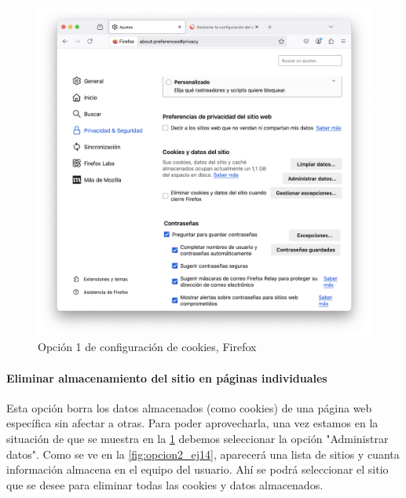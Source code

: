 \begin{figure}[H]   
    \includegraphics[width=\textwidth]{opcion1_ej14.png}
    \caption{Opción 1 de configuración de cookies, Firefox}
    \label{fig:opcion1_ej14}
\end{figure}


\paragraph{Eliminar almacenamiento del sitio en páginas individuales }

Esta opción borra los datos almacenados (como cookies) de una página web específica sin afectar a otras. Para poder aprovecharla, una vez estamos en la situación de que se muestra en la \ref{fig:opcion1_ej14} debemos seleccionar la opción "Administrar datos". Como se ve en la \ref{fig:opcion2_ej14}, aparecerá una lista de sitios y cuanta información almacena en el equipo del usuario. Ahí se podrá seleccionar el sitio que se desee para eliminar todas las cookies y datos almacenados. 

